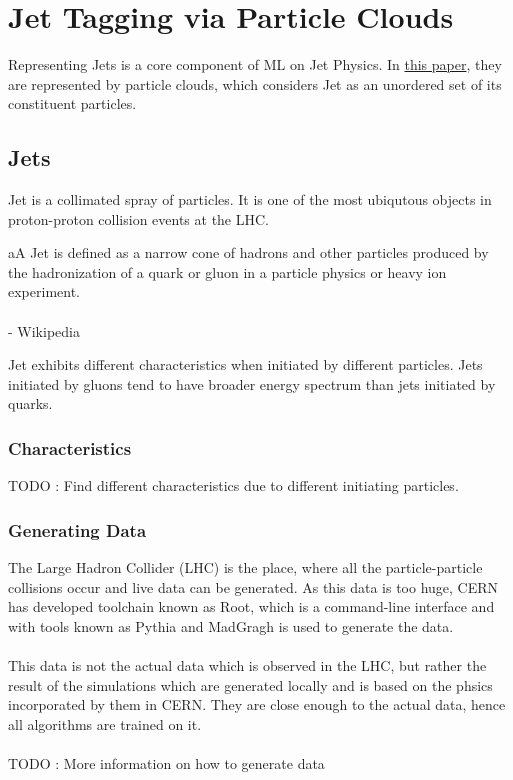 \chapter{Jet Tagging via Particle Clouds}

Representing Jets is a core component of ML on Jet Physics. In  
\href{run:../papers/Jet\ Tagging\ via\ Particle\ Clouds.pdf}{this paper}, 
they are represented by particle clouds, which considers Jet as an 
unordered set of its constituent particles.

\section{Jets}
Jet is a collimated spray of particles. It is one of the most ubiqutous 
objects in proton-proton collision events at the LHC.

\begin{definition}
    aA Jet is defined as a narrow cone of hadrons and other particles 
    produced by the hadronization of a quark or gluon in a particle physics 
    or heavy ion experiment.
    \\\\
    - Wikipedia
\end{definition}

\noindent Jet exhibits different characteristics when initiated by different 
particles. Jets initiated by gluons tend to have broader energy spectrum 
than jets initiated by quarks.

\subsection{Characteristics}
TODO : Find different characteristics due to different initiating particles.

\subsection{Generating Data}
The Large Hadron Collider (LHC) is the place, where all the particle-particle 
collisions occur and live data can be generated. As this data is too huge, 
CERN has developed toolchain known as Root, which is a command-line 
interface and with tools known as Pythia and MadGragh is used to generate the 
data.
\\\\
This data is not the actual data which is observed in the LHC, but 
rather the result of the simulations which are generated locally and is 
based on the phsics incorporated by them in CERN. They are close 
enough to the actual data, hence all algorithms are trained on it.
\\\\
TODO : More information on how to generate data


